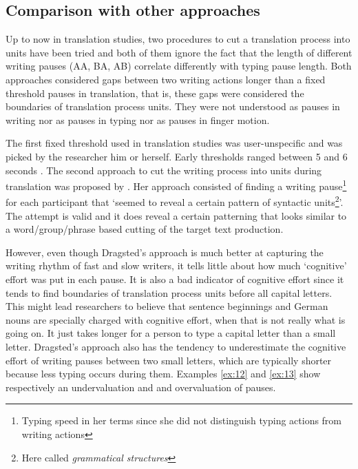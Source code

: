 \subsection{Comparison with other approaches}
\label{sec:ComparisonWithOtherApproaches}

Up to now in translation studies, two procedures to cut a translation process into units have been tried and both of them ignore the fact that the length of different writing pauses (AA, BA, AB) correlate differently with typing pause length. Both approaches considered gaps between two writing actions longer than a fixed threshold pauses in translation, that is, these gaps were considered the boundaries of translation process units. They were not understood as pauses in writing nor as pauses in typing nor as pauses in finger motion.

The first fixed threshold used in translation studies was user-unspecific and was picked by the researcher him or herself. Early thresholds ranged between 5 and 6 seconds \citep{Hansen:1999wn,Hansen:2002wu,Alves:2003va,PACTE:2005vu}. The second approach to cut the writing process into units during translation was proposed by \citet{Dragsted:2004tj,Dragsted:2005vl}. Her approach consisted of finding a writing pause\footnote{Typing speed in her terms since she did not distinguish typing actions from writing actions} for each participant that `seemed to reveal a certain pattern of syntactic units\footnote{Here called \emph{grammatical structures}}'. The attempt is valid and it does reveal a certain patterning that looks similar to a word/group/phrase based cutting of the target text production.

However, even though Dragsted's approach is much better at capturing the writing rhythm of fast and slow writers, it tells little about how much `cognitive' effort was put in each pause. It is also a bad indicator of cognitive effort since it tends to find boundaries of translation process units before all capital letters. This might lead researchers to believe that sentence beginnings and German nouns are specially charged with cognitive effort, when that is not really what is going on. It just takes longer for a person to type a capital letter than a small letter. Dragsted's approach also has the tendency to underestimate the cognitive effort of writing pauses between two small letters, which are typically shorter because less typing occurs during them. Examples \ref{ex:12} and \ref{ex:13} show respectively an undervaluation and and overvaluation of pauses.


